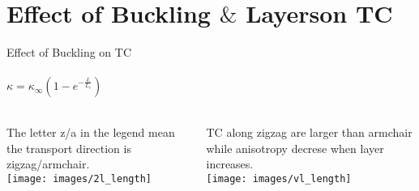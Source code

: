 \documentclass{beamer}
\begin{document}
\section{Effect of Buckling $\&$ Layerson TC}
\begin{frame}{Effect of Buckling on TC}
  \framesubtitle{$\kappa = \kappa_\infty (1-e^{-\frac{L}{L_c}})$}%

  \begin{columns}[onlytextwidth]
    \tiny
    The letter z/a in the legend mean the transport direction is zigzag/armchair.\\
    \texttt{[image: images/2l\_length]}

    TC along zigzag are larger than armchair while anisotropy decrese when layer increases.\\
    \texttt{[image: images/vl\_length]}

  \end{columns}

\end{frame}
\end{document}
